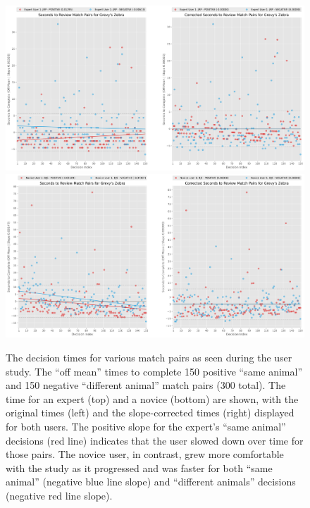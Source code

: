 \begin{figure}[!t]
    \begin{center}
        \includegraphics[width=0.90\linewidth]{resources/reviewes_jrp.pdf}
        \\
        \includegraphics[width=0.90\linewidth]{resources/reviewes_bjs.pdf}
    \end{center}
    \caption{The decision times for various match pairs as seen during the user study.  The ``off mean'' times to complete 150 positive ``same animal'' and 150 negative ``different animal'' match pairs (300 total).  The time for an expert (top) and a novice (bottom) are shown, with the original times (left) and the slope-corrected times (right) displayed for both users.  The positive slope for the expert's ``same animal'' decisions (red line) indicates that the user slowed down over time for those pairs.  The novice user, in contrast, grew more comfortable with the study as it progressed and was faster for both ``same animal'' (negative blue line slope) and ``different animals'' decisions (negative red line slope).}
    \label{fig:user-study-corrections}
\end{figure}

